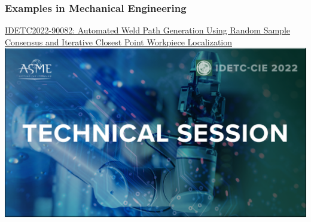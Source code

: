 \documentclass[fleqn]{beamer} %
\newcommand{\sectiontitleV}{Examples in Mechanical Engineering }
\begin{document}
\begin{frame}[label=sectionV]
\frametitle{\sectiontitleV}
\href{https://events-platform.asmeconferences.org/event/idetc-cie-2022/planning/UGxhbm5pbmdfOTcxNDk4}{IDETC2022-90082: Automated Weld Path Generation Using Random Sample Consensus and Iterative Closest Point Workpiece Localization}\vspace{5mm}\\

\includegraphics[scale=0.125]{IDETC_technical_session.png}

\end{frame}
\end{document}
